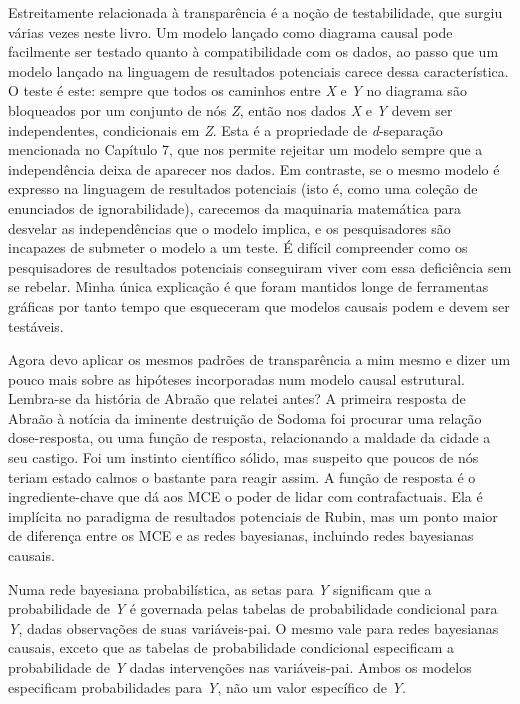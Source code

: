 \documentclass[11pt,a5paper,twoside]{book}
\begin{document}
Estreitamente relacionada à transparência é a noção de testabilidade, que surgiu várias vezes neste livro. Um modelo lançado como diagrama causal pode facilmente ser testado quanto à compatibilidade com os dados, ao passo que um modelo lançado na linguagem de resultados potenciais carece dessa característica. O teste é este: sempre que todos os caminhos entre \textit{X} e \textit{Y} no diagrama são bloqueados por um conjunto de nós \textit{Z}, então nos dados \textit{X} e \textit{Y} devem ser independentes, condicionais em \textit{Z}. Esta é a propriedade de \textit{d}-separação mencionada no Capítulo 7, que nos permite rejeitar um modelo sempre que a independência deixa de aparecer nos dados. Em contraste, se o mesmo modelo é expresso na linguagem de resultados potenciais (isto é, como uma coleção de enunciados de ignorabilidade), carecemos da maquinaria matemática para desvelar as independências que o modelo implica, e os pesquisadores são incapazes de submeter o modelo a um teste. É difícil compreender como os pesquisadores de resultados potenciais conseguiram viver com essa deficiência sem se rebelar. Minha única explicação é que foram mantidos longe de ferramentas gráficas por tanto tempo que esqueceram que modelos causais podem e devem ser testáveis.

Agora devo aplicar os mesmos padrões de transparência a mim mesmo e dizer um pouco mais sobre as hipóteses incorporadas num modelo causal estrutural. Lembra-se da história de Abraão que relatei antes? A primeira resposta de Abraão à notícia da iminente destruição de Sodoma foi procurar uma relação dose-resposta, ou uma função de resposta, relacionando a maldade da cidade a seu castigo. Foi um instinto científico sólido, mas suspeito que poucos de nós teriam estado calmos o bastante para reagir assim. A função de resposta é o ingrediente-chave que dá aos MCE o poder de lidar com contrafactuais. Ela é implícita no paradigma de resultados potenciais de Rubin, mas um ponto maior de diferença entre os MCE e as redes bayesianas, incluindo redes bayesianas causais.

Numa rede bayesiana probabilística, as setas para \textit{Y} significam que a probabilidade de \textit{Y} é governada pelas tabelas de probabilidade condicional para \textit{Y}, dadas observações de suas variáveis-pai. O mesmo vale para redes bayesianas causais, exceto que as tabelas de probabilidade condicional especificam a probabilidade de \textit{Y} dadas intervenções nas variáveis-pai. Ambos os modelos especificam probabilidades para \textit{Y}, não um valor específico de \textit{Y}.
\end{document}
